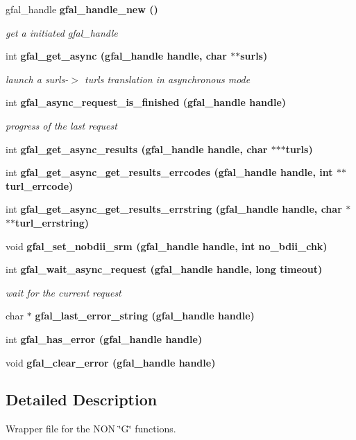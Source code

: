 \begin{CompactItemize}
\item 
gfal\_\-handle \bf{gfal\_\-handle\_\-new} ()
\begin{CompactList}\small\item\em get a initiated gfal\_\-handle \item\end{CompactList}\item 
int \bf{gfal\_\-get\_\-async} (gfal\_\-handle handle, char $\ast$$\ast$surls)
\begin{CompactList}\small\item\em launch a surls-$>$ turls translation in asynchronous mode \item\end{CompactList}\item 
int \bf{gfal\_\-async\_\-request\_\-is\_\-finished} (gfal\_\-handle handle)
\begin{CompactList}\small\item\em progress of the last request \item\end{CompactList}\item 
int \bf{gfal\_\-get\_\-async\_\-results} (gfal\_\-handle handle, char $\ast$$\ast$$\ast$turls)
\item 
int \bf{gfal\_\-get\_\-async\_\-get\_\-results\_\-errcodes} (gfal\_\-handle handle, int $\ast$$\ast$turl\_\-errcode)
\item 
int \bf{gfal\_\-get\_\-async\_\-get\_\-results\_\-errstring} (gfal\_\-handle handle, char $\ast$$\ast$$\ast$turl\_\-errstring)
\item 
void \bf{gfal\_\-set\_\-nobdii\_\-srm} (gfal\_\-handle handle, int no\_\-bdii\_\-chk)
\item 
int \bf{gfal\_\-wait\_\-async\_\-request} (gfal\_\-handle handle, long timeout)
\begin{CompactList}\small\item\em wait for the current request \item\end{CompactList}\item 
char $\ast$ \bf{gfal\_\-last\_\-error\_\-string} (gfal\_\-handle handle)
\item 
int \bf{gfal\_\-has\_\-error} (gfal\_\-handle handle)
\item 
void \bf{gfal\_\-clear\_\-error} (gfal\_\-handle handle)
\end{CompactItemize}


\subsection{Detailed Description}
Wrapper file for the NON \char`\"{}G\char`\"{} functions. 


